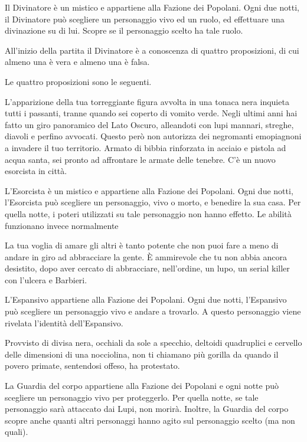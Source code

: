 {{{{{{{Il Divinatore è un mistico e appartiene alla Fazione dei Popolani. Ogni due notti, il Divinatore può scegliere un personaggio vivo
ed un ruolo, ed effettuare una divinazione su di lui. Scopre se il personaggio scelto ha tale ruolo.

All'inizio della partita il Divinatore è a conoscenza di quattro proposizioni, di cui almeno una è vera e almeno una è falsa.

Le quattro proposizioni sono le seguenti.
{%


{%
L'apparizione della tua torreggiante figura avvolta in una tonaca nera inquieta tutti i passanti, tranne quando sei coperto di vomito verde. Negli ultimi anni hai fatto un giro panoramico del Lato Oscuro, alleandoti con lupi mannari, streghe, diavoli e perfino avvocati. Questo però non autorizza dei negromanti emopiagnoni a invadere il tuo territorio. Armato di bibbia rinforzata in acciaio e pistola ad acqua santa, sei pronto ad affrontare le armate delle tenebre. C'è un nuovo esorcista in città.

L'Esorcista è un mistico e appartiene alla Fazione dei Popolani. Ogni due notti, l'Esorcista può scegliere un personaggio, vivo o morto, e benedire la sua casa. Per quella notte, i poteri utilizzati su tale personaggio non hanno effetto. Le abilità funzionano invece normalmente
{%


{%
La tua voglia di amare gli altri è tanto potente che non puoi fare a meno di andare in giro ad abbracciare la gente. È ammirevole che tu non abbia ancora desistito, dopo aver cercato di abbracciare, nell'ordine, un lupo, un serial killer con l'ulcera e Barbieri.

L'Espansivo appartiene alla Fazione dei Popolani. Ogni due notti, l'Espansivo può scegliere un personaggio vivo e andare a trovarlo. A questo personaggio viene rivelata l'identità dell'Espansivo.
{%


{%
Provvisto di divisa nera, occhiali da sole a specchio, deltoidi quadruplici e cervello delle dimensioni di una nocciolina, non ti chiamano più gorilla da quando il povero primate, sentendosi offeso, ha protestato.

La Guardia del corpo appartiene alla Fazione dei Popolani e ogni notte può scegliere un personaggio vivo per proteggerlo. Per quella notte, se tale personaggio sarà attaccato dai Lupi, non morirà. Inoltre, la Guardia del corpo scopre anche quanti altri personaggi hanno agito sul personaggio scelto (ma non quali).
{%


}}}}}}}}}}}}}}
